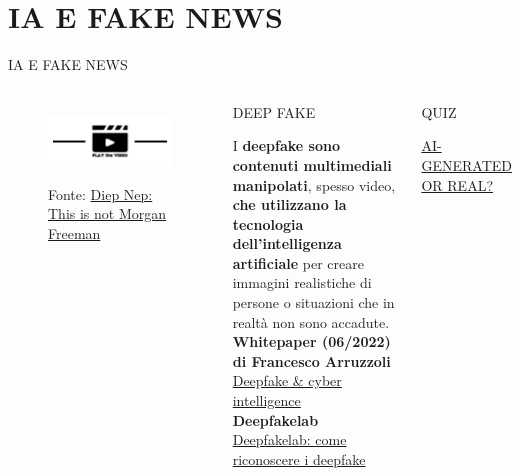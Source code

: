\documentclass[aspectratio=1610]{beamer}
\begin{document}
\section{IA E FAKE NEWS}

\begin{frame}{IA E FAKE NEWS}
    \begin{columns}        
            \begin{figure}
                \href{https://www.youtube.com/watch?v=oxXpB9pSETo}{\includegraphics[width=\linewidth]{img/play.png}}
                \caption{{Fonte: \href{https://www.youtube.com/watch?v=oxXpB9pSETo}{Diep Nep: This is not Morgan Freeman}}}
            \end{figure}
            \begin{alertblock}{DEEP FAKE}
                \begin{minipage}{0.98\linewidth}
                    \justifying
                    I \textbf{deepfake sono contenuti multimediali manipolati}, spesso video, \textbf{che utilizzano la tecnologia 
                    dell’intelligenza artificiale} per creare immagini realistiche di persone o situazioni che 
                    in realtà non sono accadute.\\
                    \bigskip
                    \tiny{\textbf{Whitepaper (06/2022) di Francesco Arruzzoli}}\\
                    \tiny{\href{https://www.ictsecuritymagazine.com/pubblicazioni/deepfake-cyber-intelligence/}{Deepfake \& cyber intelligence}}\\
                    \tiny{\textbf{Deepfakelab}}\\
                    \tiny{\href{https://deepfakelab.theglassroom.org/index-it_IT.html}{Deepfakelab: come riconoscere i deepfake}}
                \end{minipage}
            \end{alertblock}
            \pause
            \begin{alertblock}{QUIZ}
                \begin{minipage}{0.98\linewidth}
                    \tiny{\href{https://detectfakes.kellogg.northwestern.edu/}{AI-GENERATED OR REAL?}}
                \end{minipage}
            \end{alertblock}
    \end{columns}
\end{frame}
\end{document}

